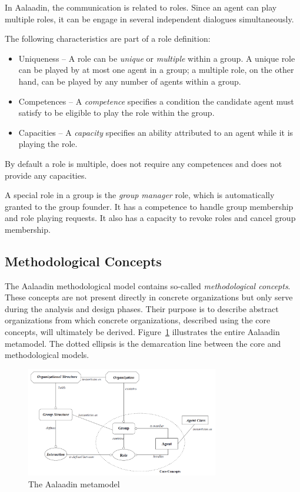 In Aalaadin, the communication is related to roles. Since an agent can play multiple roles, it can be engage in several independent dialogues simultaneously.

The following characteristics are part of a role definition:
\begin{itemize}
	\item Uniqueness --  A role can be \textit{unique} or \textit{multiple} within a group.
	A unique role can be played by at most one agent in a group; a multiple role, on the other hand, can be played by any number of agents within a group. 
	\item Competences -- A \textit{competence} specifies a condition the candidate agent must satisfy to be eligible to play the role within the group. 
	\item Capacities -- A \textit{capacity} specifies an ability attributed to an agent while it is playing the role.
\end{itemize}
By default a role is multiple, does not require any competences and does not provide any capacities.

A special role in a group is the \textit{group manager} role, which is automatically granted to the group founder.
It has a competence to handle group membership and role playing requests.
It also has a capacity to revoke roles and cancel group membership.

\subsection{Methodological Concepts}

The Aalaadin methodological model contains so-called \textit{methodological concepts}.
These concepts are not present directly in concrete organizations but only serve during the analysis and design phases.
Their purpose is to describe abstract organizations from which concrete organizations, described using the core concepts, will ultimately be derived.
Figure~\ref{figure:aalaadin-metamodel} illustrates the entire Aalaadin metamodel. The dotted ellipsis is the demarcation line between the core and methodological models.

\begin{figure}[h]
	\centering
	\includegraphics[width=0.75\textwidth]{images/aalaadin/aalaadin-metamodel.png}
	\caption{The Aalaadin metamodel}
	\label{figure:aalaadin-metamodel}
\end{figure}

